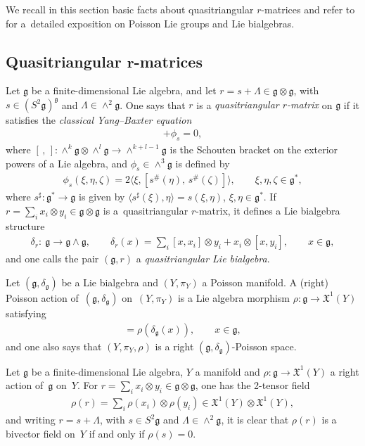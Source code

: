 \documentclass[10pt,a4paper]{amsart}
\numberwithin{equation}{section}
\newcommand{\XX}{\mathfrak{X}}
\def \g {\mathfrak{a}}
\def \g {\mathfrak{g}}
\newcommand{\la}{\langle}
\newcommand{\ra}{\rangle}
\newcommand{\piY}{{\pi_{\scriptscriptstyle Y}}}
\begin{document}
We recall in this section basic facts about quasitriangular $r$-matrices and refer to \cite{Lu-Mou:mixed} for a~detailed exposition on Poisson Lie groups and Lie bialgebras.

\subsection[Quasitriangular $r$-matrices]{Quasitriangular $\boldsymbol{r}$-matrices}

Let $\g$ be a f\/inite-dimensional Lie algebra, and let $r = s + \Lambda \in \g \otimes \g$, with $s \in (S^2\g)^\g$ and $\Lambda \in \wedge^2 \g$. One says that $r$ is a {\it quasitriangular $r$-matrix} on $\g$ if it satisf\/ies the {\it classical Yang--Baxter equation}
\begin{gather*}
[\Lambda, \Lambda] + \phi_s = 0, %
\end{gather*}
where $[\, , \,]\colon \wedge^k \g \otimes \wedge^l \g \to \wedge^{k+l-1} \g$ is the Schouten bracket on the exterior powers of a Lie algebra, and $\phi_s \in \wedge^3 \g$ is def\/ined by
\begin{gather}
\phi_s(\xi, \eta, \zeta) = 2 \la \xi, [s^\#(\eta), \, s^\#(\zeta)]\ra, \qquad \xi, \eta, \zeta \in \g^*, \label{eq-cyb}
\end{gather}
where $s^\sharp\colon \g^* \to \g$ is given by $\la s^\sharp(\xi), \eta \ra = s(\xi, \eta)$, $\xi, \eta \in \g^*$. If $r = \sum_i x_i \otimes y_i \in \g \otimes \g$ is a~quasitriangular $r$-matrix, it def\/ines a Lie bialgebra structure
\begin{gather*}
\delta_r\colon \ \g \to \g \wedge \g, \qquad \delta_r(x) = \sum_i [x, x_i] \otimes y_i + x_i \otimes [x, y_i], \qquad x \in \g,
\end{gather*}
and one calls the pair $(\g, r)$ a {\it quasitriangular Lie bialgebra}.

Let $(\g, \delta_\g)$ be a Lie bialgebra and $(Y, \piY)$ a Poisson manifold. A (right) Poisson action of~$(\g, \delta_\g)$ on~$(Y, \piY)$ is a Lie algebra morphism $\rho\colon \g \to \XX^1(Y)$ satisfying
\begin{gather*}
[\rho(x), \piY] = \rho(\delta_\g(x)), \qquad x \in \g,
\end{gather*}
and one also says that $(Y, \piY, \rho)$ is a right $(\g, \delta_\g)$-Poisson space.

Let $\g$ be a f\/inite-dimensional Lie algebra, $Y$ a manifold and $\rho\colon \g \to \XX^1(Y)$ a right action of~$\g$ on~$Y$. For $r = \sum_i x_i \otimes y_i \in \g \otimes \g$, one has the 2-tensor f\/ield
\begin{gather*}
\rho(r) = \sum_i \rho(x_i) \otimes \rho(y_i) \in \XX^1(Y) \otimes \XX^1(Y),
\end{gather*}
and writing $r = s + \Lambda$, with $s \in S^2 \g$ and $\Lambda \in \wedge^2 \g$, it is clear that $\rho(r)$ is a bivector f\/ield on~$Y$ if and only if $\rho(s) = 0$.
\end{document}
